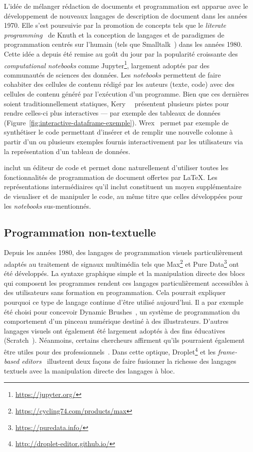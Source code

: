 L'idée de mélanger rédaction de documents et programmation est apparue avec le développement de nouveaux langages de description de document dans les années 1970.
Elle s'est poursuivie par la promotion de concepts tels que le \emph{literate programming}~\cite{knuth1984literate} de Knuth et la conception de langages et de paradigmes de programmation centrés sur l'humain (tels que Smalltalk~\cite{goldberg1983smalltalk}) dans les années 1980.
Cette idée a depuis été remise au goût du jour par la popularité croissante des \emph{computational notebooks} comme Jupyter\footnote{\url{https://jupyter.org/}}, largement adoptés par des communautés de sciences des données.
Les \emph{notebooks} permettent de faire cohabiter des cellules de contenu rédigé par les auteurs (texte, code) avec des cellules de contenu généré par l'exécution d'un programme.
Bien que ces dernières soient traditionnellement statiques, Kery~\etal~\cite{kery2020future} présentent plusieurs pistes pour rendre celles-ci plus interactives --- par exemple des tableaux de données (Figure~\ref{fig:interactive-dataframe-exemple}).
Wrex~\cite{drosos2020wrex} permet par exemple de synthétiser le code permettant d'insérer et de remplir une nouvelle colonne à partir d'un ou plusieurs exemples fournis interactivement par les utilisateurs via la représentation d'un tableau de données.

\iLaTeX{} inclut un éditeur de code et permet donc naturellement d'utiliser toutes les fonctionnalités de programmation de document offertes par \LaTeX{}.
Les représentations intermédiaires qu'il inclut constituent un moyen supplémentaire de
visualiser et de manipuler le code, au même titre que celles développées pour les \emph{notebooks} sus-mentionnés.



\subsection{Programmation non-textuelle}

Depuis les années 1980, des langages de programmation visuels particulièrement adaptés au traitement de signaux multimédia tels que Max\footnote{\url{https://cycling74.com/products/max}} et Pure Data\footnote{\url{https://puredata.info/}} ont été développés.
La syntaxe graphique simple et la manipulation directe des blocs qui composent les programmes rendent ces langages particulièrement accessibles à des utilisateurs sans formation en programmation.
Cela pourrait expliquer pourquoi ce type de langage continue d'être utilisé aujourd'hui.
Il a par exemple été choisi pour concevoir Dynamic Brushes~\cite{jacobs2018extending}, un système de programmation du comportement d'un pinceau numérique destiné à des illustrateurs.
D'autres langages visuels ont également été largement adoptés à des fins éducatives (\eg Scratch~\cite{resnick2009scratch}).
Néanmoins, certains chercheurs affirment qu'ils pourraient également être utiles pour des professionnels~\cite{bau2017learnable}.
Dans cette optique, Droplet\footnote{\url{http://droplet-editor.github.io/}} et les \emph{frame-based editors}~\cite{kolling2017frame} illustrent deux façons de 
faire fusionner la richesse des langages textuels avec la manipulation directe des langages à bloc.

